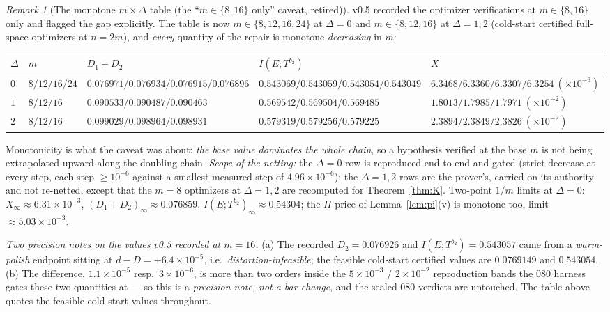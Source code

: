 \documentclass[11pt]{article}
\theoremstyle{definition}
\theoremstyle{remark}
\newtheorem{remark}{Remark}
\begin{document}
\begin{remark}[The monotone $m\times\Delta$ table (the
``$m\in\{8,16\}$ only'' caveat, retired)]
\label{rem:mtable}
v0.5 recorded the optimizer verifications at $m\in\{8,16\}$ only and
flagged the gap explicitly. The table is now
$m\in\{8,12,16,24\}$ at $\Delta=0$ and $m\in\{8,12,16\}$ at
$\Delta=1,2$ (cold-start certified full-space optimizers at $n=2m$),
and \emph{every} quantity of the repair is monotone
\emph{decreasing} in $m$:
\begin{center}
\begin{tabular}{lllll}
$\Delta$ & $m$ & $D_1+D_2$ & $I(E;T^{b_2})$ & $X$\\
\hline
$0$ & $8/12/16/24$ & $0.076971/0.076934/0.076915/0.076896$
 & $0.543069/0.543059/0.543054/0.543049$
 & $6.3468/6.3360/6.3307/6.3254\ (\times10^{-3})$\\
$1$ & $8/12/16$ & $0.090533/0.090487/0.090463$
 & $0.569542/0.569504/0.569485$
 & $1.8013/1.7985/1.7971\ (\times10^{-2})$\\
$2$ & $8/12/16$ & $0.099029/0.098964/0.098931$
 & $0.579319/0.579256/0.579225$
 & $2.3894/2.3849/2.3826\ (\times10^{-2})$\\
\end{tabular}
\end{center}
Monotonicity is what the caveat was about: \emph{the base value
dominates the whole chain}, so a hypothesis verified at the base $m$
is not being extrapolated upward along the doubling chain.
\emph{Scope of the netting:} the $\Delta=0$ row is reproduced
end-to-end and gated (strict decrease at every step, each step
$\ge10^{-6}$ against a smallest measured step of
$4.96\times10^{-6}$); the $\Delta=1,2$ rows are the prover's, carried
on its authority and not re-netted, except that the $m=8$ optimizers
at $\Delta=1,2$ are recomputed for Theorem~\ref{thm:K}. Two-point
$1/m$ limits at $\Delta=0$: $X_\infty\approx6.31\times10^{-3}$,
$(D_1+D_2)_\infty\approx0.076859$,
$I(E;T^{b_2})_\infty\approx0.54304$; the $\Pi$-price of
Lemma~\ref{lem:pi}(v) is monotone too, limit $\approx5.03\times10^{-3}$.

\emph{Two precision notes on the values v0.5 recorded at $m=16$.}
(a) The recorded $D_2=0.076926$ and $I(E;T^{b_2})=0.543057$ came from a
\emph{warm-polish} endpoint sitting at $d-D=+6.4\times10^{-5}$, i.e.\
\emph{distortion-infeasible}; the feasible cold-start certified values
are $0.0769149$ and $0.543054$. (b) The difference, $1.1\times10^{-5}$
resp.\ $3\times10^{-6}$, is more than two orders inside the $5\times
10^{-3}$ / $2\times10^{-2}$ reproduction bands the 080 harness gates
these two quantities at --- so this is a \emph{precision note, not a
bar change}, and the sealed 080 verdicts are untouched. The table above
quotes the feasible cold-start values throughout.
\end{remark}
\end{document}
